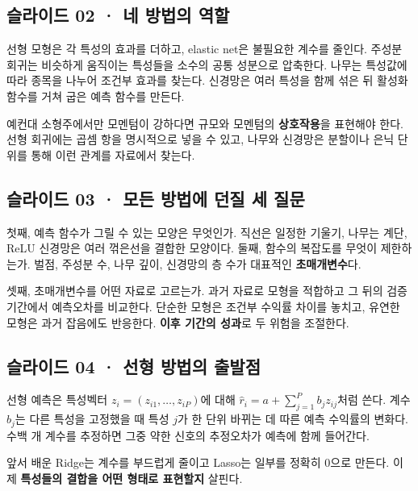 \documentclass[11pt,a4paper]{article}
\begin{document}
\subsection{슬라이드 02 · 네 방법의 역할}
선형 모형은 각 특성의 효과를 더하고, elastic net은 불필요한 계수를 줄인다. 주성분 회귀는 비슷하게 움직이는 특성들을 소수의 공통 성분으로 압축한다. 나무는 특성값에 따라 종목을 나누어 조건부 효과를 찾는다. 신경망은 여러 특성을 함께 섞은 뒤 활성화 함수를 거쳐 굽은 예측 함수를 만든다.\par

예컨대 소형주에서만 모멘텀이 강하다면 규모와 모멘텀의 \textbf{상호작용}을 표현해야 한다. 선형 회귀에는 곱셈 항을 명시적으로 넣을 수 있고, 나무와 신경망은 분할이나 은닉 단위를 통해 이런 관계를 자료에서 찾는다.\par

\subsection{슬라이드 03 · 모든 방법에 던질 세 질문}
첫째, 예측 함수가 그릴 수 있는 모양은 무엇인가. 직선은 일정한 기울기, 나무는 계단, ReLU 신경망은 여러 꺾은선을 결합한 모양이다. 둘째, 함수의 복잡도를 무엇이 제한하는가. 벌점, 주성분 수, 나무 깊이, 신경망의 층 수가 대표적인 \textbf{초매개변수}다.\par

셋째, 초매개변수를 어떤 자료로 고르는가. 과거 자료로 모형을 적합하고 그 뒤의 검증 기간에서 예측오차를 비교한다. 단순한 모형은 조건부 수익률 차이를 놓치고, 유연한 모형은 과거 잡음에도 반응한다. \textbf{이후 기간의 성과}로 두 위험을 조절한다.\par

\subsection{슬라이드 04 · 선형 방법의 출발점}
선형 예측은 특성벡터 $z_i=(z_{i1},\ldots,z_{iP})$에 대해 $\hat r_i=a+\sum_{j=1}^{P}b_jz_{ij}$처럼 쓴다. 계수 $b_j$는 다른 특성을 고정했을 때 특성 $j$가 한 단위 바뀌는 데 따른 예측 수익률의 변화다. 수백 개 계수를 추정하면 그중 약한 신호의 추정오차가 예측에 함께 들어간다.\par

앞서 배운 Ridge는 계수를 부드럽게 줄이고 Lasso는 일부를 정확히 0으로 만든다. 이제 \textbf{특성들의 결합을 어떤 형태로 표현할지} 살핀다.\par

\end{document}
